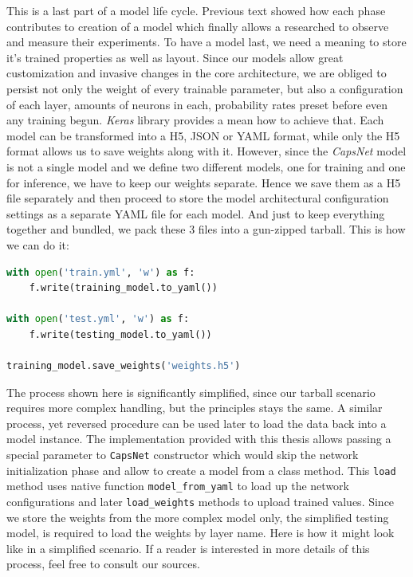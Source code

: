 This is a last part of a model life cycle. Previous text showed how each phase contributes to creation of a model which finally allows a researched to observe and measure their experiments. To have a model last, we need a meaning to store it's trained properties as well as layout. Since our models allow great customization and invasive changes in the core architecture, we are obliged to persist not only the weight of every trainable parameter, but also a configuration of each layer, amounts of neurons in each, probability rates preset before even any training begun. \textit{Keras} library provides a mean how to achieve that. Each model can be transformed into a H5, JSON or YAML format, while only the H5 format allows us to save weights along with it. However, since the \textit{CapsNet} model is not a single model and we define two different models, one for training and one for inference, we have to keep our weights separate. Hence we save them as a H5 file separately and then proceed to store the model architectural configuration settings as a separate YAML file for each model. And just to keep everything together and bundled, we pack these 3 files into a gun-zipped tarball. This is how we can do it:

\begin{lstlisting}[language=Python, caption=Saving a model in \textit{Keras}]
with open('train.yml', 'w') as f:
    f.write(training_model.to_yaml())

with open('test.yml', 'w') as f:
    f.write(testing_model.to_yaml())

training_model.save_weights('weights.h5')
\end{lstlisting}

The process shown here is significantly simplified, since our tarball scenario requires more complex handling, but the principles stays the same. A similar process, yet reversed procedure can be used later to load the data back into a model instance. The implementation provided with this thesis allows passing a special parameter to \texttt{CapsNet} constructor which would skip the network initialization phase and allow to create a model from a class method. This \texttt{load} method uses native function \texttt{model\_from\_yaml} to load up the network configurations and later \texttt{load\_weights} methods to upload trained values. Since we store the weights from the more complex model only, the simplified testing model, is required to load the weights by layer name. Here is how it might look like in a simplified scenario. If a reader is interested in more details of this process, feel free to consult our sources.

